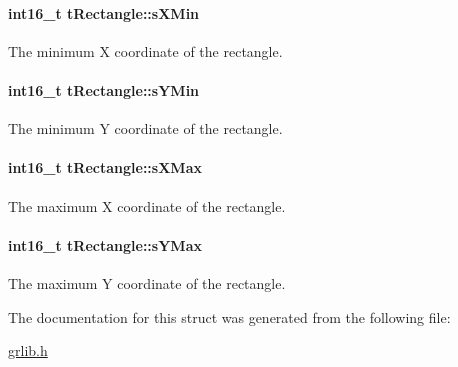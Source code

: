 \paragraph[{s\+X\+Min}]{\setlength{\rightskip}{0pt plus 5cm}int16\+\_\+t t\+Rectangle\+::s\+X\+Min}\label{structt_rectangle_a873c21850bef092981d16bba615b6c98}


The minimum X coordinate of the rectangle. 

\paragraph[{s\+Y\+Min}]{\setlength{\rightskip}{0pt plus 5cm}int16\+\_\+t t\+Rectangle\+::s\+Y\+Min}\label{structt_rectangle_a99f8d734c2a12f301bd2a9e8b9036a7a}


The minimum Y coordinate of the rectangle. 

\paragraph[{s\+X\+Max}]{\setlength{\rightskip}{0pt plus 5cm}int16\+\_\+t t\+Rectangle\+::s\+X\+Max}\label{structt_rectangle_a9edcf50a0eafaa7eed1ab371b4107a5a}


The maximum X coordinate of the rectangle. 

\paragraph[{s\+Y\+Max}]{\setlength{\rightskip}{0pt plus 5cm}int16\+\_\+t t\+Rectangle\+::s\+Y\+Max}\label{structt_rectangle_aa9c0683f5c6dc0153b913354b5bba805}


The maximum Y coordinate of the rectangle. 



The documentation for this struct was generated from the following file\+:\begin{DoxyCompactItemize}
\item 
\hyperlink{grlib_8h}{grlib.\+h}\end{DoxyCompactItemize}
